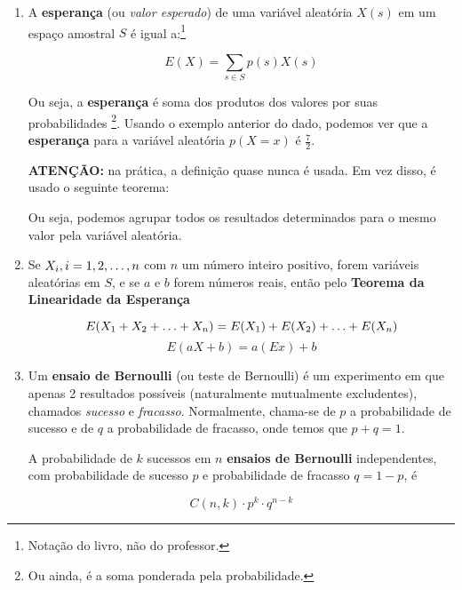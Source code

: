 \documentclass{article}
\begin{document}
\begin{enumerate}
    \item A \textbf{esperança} (ou \textit{valor esperado}) de uma variável aleatória \( X(s) \) em um espaço amostral \( S \) é igual a:\footnote{Notação do livro, não do professor.}

        \[ E(X) = \sum_{s \in S} p(s)X(s)\] 

        Ou seja, a \textbf{esperança} é soma dos produtos dos valores por suas probabilidades \footnote{Ou ainda, é a soma ponderada pela probabilidade.}. Usando o exemplo anterior do dado, podemos ver que a \textbf{esperança} para a variável aleatória \( p(X = x) \) é \( \frac{7}{2} \).

        \textbf{ATENÇÃO:} na prática, a definição quase nunca é usada. Em vez disso, é usado o seguinte teorema:


        Ou seja, podemos agrupar todos os resultados determinados para o mesmo valor pela variável aleatória.

    \item Se \( X_i, i = 1, 2, \mathellipsis, n \) com \( n \) um número inteiro positivo, forem variáveis aleatórias em \( S \), e se \( a \) e \( b \) forem números reais, então pelo \textbf{Teorema da Linearidade da Esperança} 

        \[ E(X_1 + X_2 + \mathellipsis + X_n) = E(X_1) + E(X_2) + \mathellipsis + E(X_n) \] 
        \[ E(aX + b) = a(Ex) + b \] 

    \item Um \textbf{ensaio de Bernoulli} (ou teste de Bernoulli) é um experimento em que apenas 2 resultados possíveis (naturalmente mutualmente excludentes), chamados \textit{sucesso} e \textit{fracasso}. Normalmente, chama-se de \( p \) a probabilidade de sucesso e de \( q \) a probabilidade de fracasso, onde temos que \( p + q = 1 \).

        A probabilidade de \( k \) sucessos em \( n \) \textbf{ensaios de Bernoulli} independentes, com probabilidade de sucesso \( p \) e probabilidade de fracasso \( q = 1 - p\), é

        \[ C(n,k) \cdot p^{k} \cdot q^{n-k} \] 


\end{enumerate}
\end{document}

